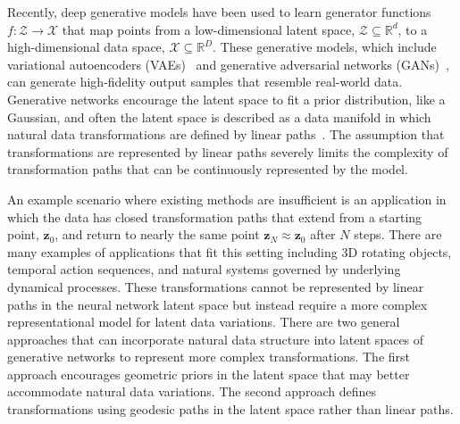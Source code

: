 \documentclass[letterpaper]{article} %
\newcommand{\vtr}[1]{\ensuremath{\mathbf{#1}}}
\begin{document}
Recently, deep generative models have been used to learn generator functions $f : \mathcal{Z} \rightarrow \mathcal{X}$ that map points from a low-dimensional latent space, $\mathcal{Z} \subseteq \mathbb{R}^d$,  to a high-dimensional data space, $\mathcal{X} \subseteq \mathbb{R}^D$. These generative models, which include variational autoencoders (VAEs)~\cite{kingma2013auto} and generative adversarial networks (GANs)~\cite{goodfellow2014generative}, can generate high-fidelity output samples that resemble real-world data. Generative networks encourage the latent space to fit a prior distribution, like a Gaussian, and often the latent space is described as a data manifold in which natural data transformations are defined by linear paths~\cite{radford2015unsupervised}. The assumption that transformations are represented by linear paths severely limits the complexity of transformation paths that can be continuously represented by the model. 

An example scenario where existing methods are insufficient is an application in which the data has closed transformation paths that extend from a starting point, $\vtr{z}_0$, and return to nearly the same point $\vtr{z}_N \approx \vtr{z}_0$ after $N$ steps. There are many examples of applications that fit this setting including 3D rotating objects, temporal action sequences, and natural systems governed by underlying dynamical processes. These transformations cannot be represented by linear paths in the neural network latent space but instead require a more complex representational model for latent data variations. There are two general approaches that can incorporate natural data structure into latent spaces of generative networks to represent more complex transformations. The first approach encourages geometric priors in the latent space that may better accommodate natural data variations. The second approach defines transformations using geodesic paths in the latent space rather than linear paths.
\end{document}
